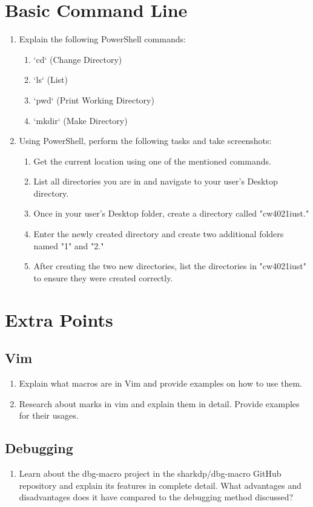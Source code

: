 \documentclass[titlepage]{article}
\begin{document}
\section{Basic Command Line}
\begin{enumerate}
    \item Explain the following PowerShell commands:
    \begin{enumerate}
        \item `cd` (Change Directory)
        \item `ls` (List)
        \item `pwd` (Print Working Directory)
        \item `mkdir` (Make Directory)
    \end{enumerate}
    \item Using PowerShell, perform the following tasks and take screenshots:
    \begin{enumerate}
        \item Get the current location using one of the mentioned commands.
        \item List all directories you are in and navigate to your user's Desktop directory.
        \item Once in your user's Desktop folder, create a directory called "cw4021iust."
        \item Enter the newly created directory and create two additional folders named "1" and "2."
        \item After creating the two new directories, list the directories in "cw4021iust" to ensure they were created correctly.
    \end{enumerate}
\end{enumerate}

\pagebreak

\section{Extra Points}
\subsection{Vim}
\begin{enumerate}
    \item Explain what macros are in Vim and provide examples on how to use them.
    \item Research about marks in vim and explain them in detail. Provide examples for their usages.
\end{enumerate}
\subsection{Debugging}
\begin{enumerate}
    \item Learn about the dbg-macro project in the sharkdp/dbg-macro GitHub repository and explain its
        features in complete detail. What advantages and disadvantages does it have compared to the
        debugging method discussed?
\end{enumerate}
\end{document}
